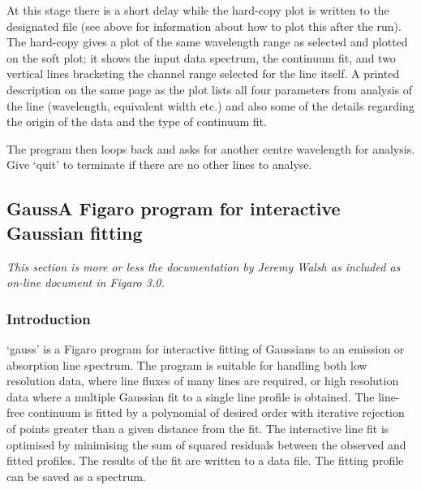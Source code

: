   At this stage there is a short delay while the hard-copy plot is
   written to the designated file (see above for information about how
   to plot this after the run). The hard-copy gives a plot of the same
   wavelength range as selected and plotted on the soft plot; it shows
   the input data spectrum, the continuum fit, and two vertical lines
   bracketing the channel range selected for the line itself. A printed
   description on the same page as the plot lists all four parameters
   from analysis of the line (wavelength, equivalent width etc.) and
   also some of the details regarding the origin of the data and the
   type of continuum fit.

   The program then loops back and asks for another centre wavelength
   for analysis. Give `quit' to terminate if there are no other lines to
   analyse.


\subsection{\label{techno12}Gauss\latorhtm{---}{-}A
   Figaro program for interactive Gaussian fitting}

{\em
   This section is more or less the documentation by Jeremy Walsh as
   included as on-line document in Figaro 3.0.
\/}


\subsubsection{\label{techno12intro}Introduction}

   `gauss' is a Figaro program for interactive fitting of Gaussians to
   an emission or absorption line spectrum. The program is suitable for
   handling both low resolution data, where line fluxes of many lines
   are required, or high resolution data where a multiple Gaussian fit
   to a single line profile is obtained. The line-free continuum is
   fitted by a polynomial of desired order with iterative rejection of
   points greater than a given distance from the fit. The interactive
   line fit is optimised by minimising the sum of squared residuals
   between the observed and fitted profiles. The results of the fit are
   written to a data file. The fitting profile can be saved as a
   spectrum.

